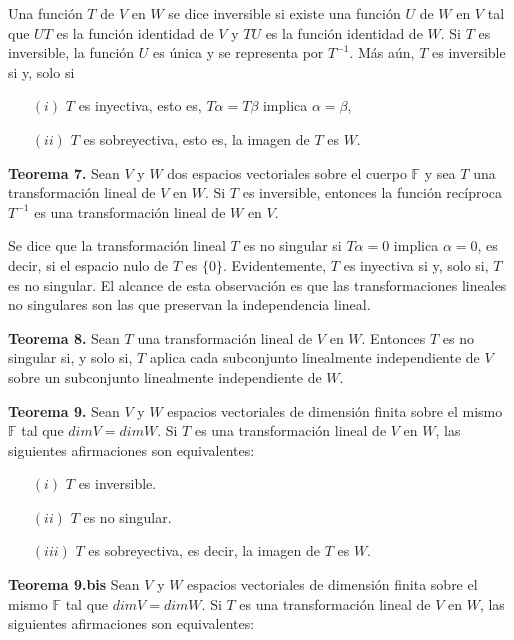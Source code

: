 \newpage
Una función $T$ de $V$ en $W$ se dice inversible si existe una función
$U$ de $W$ en $V$ tal que $UT$ es la función identidad de $V$ y
$TU$ es la función identidad de $W$.
Si $T$ es inversible, la función $U$ es única y se representa por $T^{-1}$.
Más aún, $T$ es inversible si y, solo si

\begin{itemize}
    \item[$(i)$] $T$ es inyectiva, esto es, $T\alpha = T\beta$ implica $\alpha = \beta$,
    \item[$(ii)$] $T$ es sobreyectiva, esto es, la imagen de $T$ es $W$.
\end{itemize}

\textbf{Teorema 7.} Sean $V$ y $W$ dos espacios vectoriales
sobre el cuerpo $\mathbb{F}$ y sea $T$ una transformación lineal
de $V$ en $W$. Si $T$ es inversible, entonces la función recíproca
$T^{-1}$ es una transformación lineal de $W$ en $V$.

Se dice que la transformación lineal $T$ es no singular si
$T\alpha = 0$ implica $\alpha = 0$, es decir, si el espacio
nulo de $T$ es $\{0\}$. Evidentemente, $T$ es inyectiva si y, solo
si, $T$ es no singular. El alcance de esta observación es que
las transformaciones lineales no singulares son las que preservan
la independencia lineal.

\textbf{Teorema 8.} Sean $T$ una transformación lineal de $V$
en $W$. Entonces $T$ es no singular si, y solo si, $T$ aplica
cada subconjunto linealmente independiente de $V$ sobre un
subconjunto linealmente independiente de $W$.

\textbf{Teorema 9.} Sean $V$ y $W$ espacios vectoriales de
dimensión finita sobre el mismo $\mathbb{F}$ tal que
$dim V = dim W$. Si $T$ es una transformación lineal de $V$
en $W$, las siguientes afirmaciones son equivalentes:

\begin{itemize}
    \item[$(i)$] $T$ es inversible.
    \item[$(ii)$] $T$ es no singular.
    \item[$(iii)$] $T$ es sobreyectiva, es decir, la imagen de $T$ es $W$.
\end{itemize}

\textbf{Teorema 9.bis} Sean $V$ y $W$ espacios vectoriales de
dimensión finita sobre el mismo $\mathbb{F}$ tal que
$dim V = dim W$. Si $T$ es una transformación lineal de $V$
en $W$, las siguientes afirmaciones son equivalentes:

